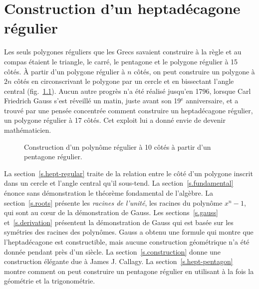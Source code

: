 

\chapter{Construction d'un heptadécagone régulier}\label{c.heptadecagon}





Les seuls polygones réguliers que les Grecs savaient construire à la  règle et au compas étaient le triangle, le carré, le pentagone et le polygone régulier à 15 côtés. À partir d'un polygone régulier à $n$  côtés, on peut construire un polygone à $2n$  côtés en circonscrivant le polygone par un cercle et en bissectant l'angle central (fig.~\ref{f.hept-double}). Aucun autre progrès n'a été réalisé jusqu'en 1796, lorsque Carl Friedrich Gauss s'est réveillé un matin, juste avant son 19$^\text{e}$  anniversaire, et a trouvé par une \og pensée concentrée\fg{} comment construire un heptadécagone régulier, un polygone régulier à 17  côtés. Cet exploit lui a donné envie de devenir mathématicien.

\begin{figure}[htbp]
\centering
{}

\caption{Construction d'un polynôme régulier à 10 côtés à partir d'un pentagone régulier.}\label{f.hept-double}
\end{figure}

La section~\ref{s.hept-regular} traite de la relation entre le côté d'un polygone inscrit dans un cercle et l'angle central qu'il sous-tend. La section~\ref{s.fundamental} énonce sans démonstration le théorème fondamental de l'algèbre. La section~\ref{s.roots} présente les \emph{racines de l'unité}, les racines du polynôme $x^n-1$, qui sont au cœur de la démonstration de Gauss. Les sections~\ref{s.gauss} et~\ref{s.derivation} présentent la démonstration de Gauss qui est basée sur les symétries des racines des polynômes. Gauss a obtenu une formule qui montre que l'heptadécagone est constructible, mais aucune construction géométrique n'a été donnée pendant près d'un siècle. La section~\ref{s.construction} donne une construction élégante due à  James J. Callagy. La section~\ref{s.hept-pentagon} montre comment on peut construire un pentagone régulier en utilisant à la fois la géométrie et la trigonométrie.

